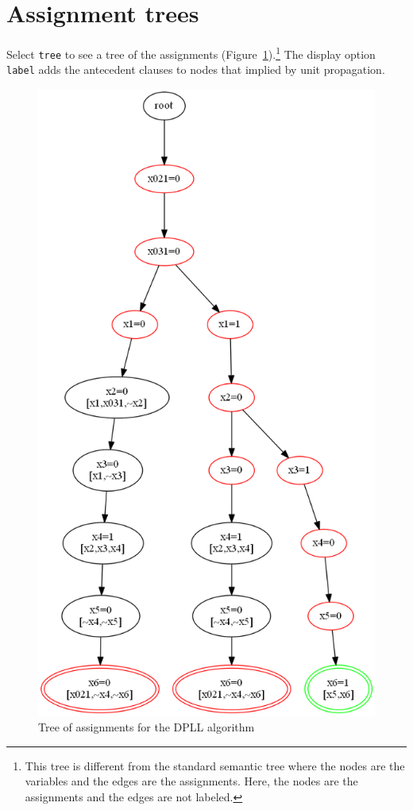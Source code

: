\documentclass[11pt]{article}
\newcommand*{\p}[1]{\textup{\texttt{#1}}}
\begin{document}
\begin{itemize}
\end{itemize}

\newpage

\section{Assignment trees}

Select \p{tree} to see a tree of the assignments
(Figure~\ref{tree1}).\footnote{This tree is different from the standard
semantic tree where the nodes are the variables and the edges are the
assignments. Here, the nodes are the assignments and the edges are not
labeled.} The display option \p{label} adds the antecedent clauses to
nodes that implied by unit propagation.

\begin{figure}
\begin{center}
\includegraphics[keepaspectratio=true,height=.9\textheight]{tree1}
\end{center}
\caption{Tree of assignments for the DPLL algorithm}\label{tree1}
\end{figure}
\end{document}
